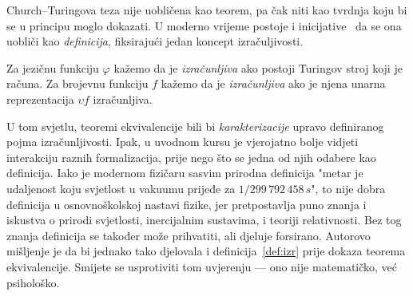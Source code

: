 Church--\!Turingova teza nije uobličena kao teorem, pa čak niti kao tvrdnja koju bi se u principu moglo dokazati. U moderno vrijeme postoje i inicijative~\cite{soare} da se ona uobliči kao \emph{definicija}, fiksirajući jedan koncept izračuljivosti.

\begin{definicija}\label{def:izr}
Za jezičnu funkciju $\varphi$ kažemo da je \emph{izračunljiva} ako postoji Turingov stroj koji je računa.
Za brojevnu funkciju $f$ kažemo da je \emph{izračunljiva} ako je njena unarna reprezentacija $\upsilon f$ izračunljiva.
\end{definicija}

U tom svjetlu, teoremi ekvivalencije bili bi \emph{karakterizacije} upravo definiranog pojma izračunljivosti. Ipak, u uvodnom kursu je vjerojatno bolje vidjeti interakciju raznih formalizacija, prije nego što se jedna od njih odabere kao definicija. Iako je modernom fizičaru sasvim prirodna definicija "metar je udaljenost koju svjetlost u vakuumu prijeđe za $1/299\,792\,458\,s$", to nije dobra definicija u osnovnoškolskoj nastavi fizike, jer pretpostavlja puno znanja i iskustva o prirodi svjetlosti, inercijalnim sustavima, i teoriji relativnosti. Bez tog znanja definicija se također može prihvatiti, ali djeluje forsirano. Autorovo mišljenje je da bi jednako tako djelovala i definicija~\ref{def:izr} prije dokaza teorema ekvivalencije. Smijete se usprotiviti tom uvjerenju --- ono nije matematičko, već psihološko.

